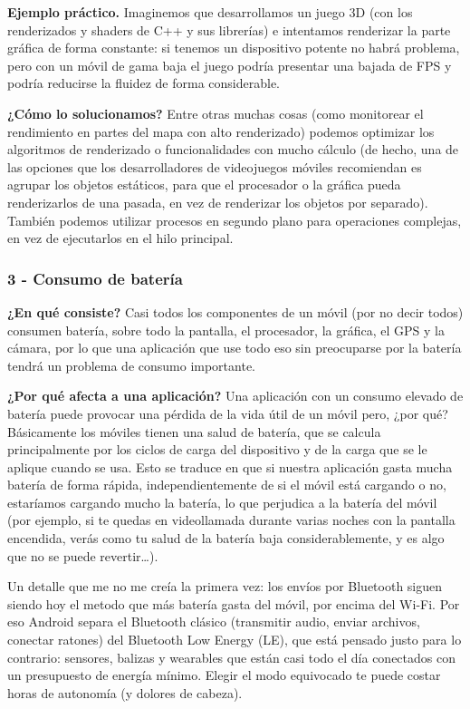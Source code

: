 \documentclass[11pt,a4paper]{article}
\newcommand{\campo}[1]{\textbf{\color{ink}#1}}
\begin{document}
	\campo{Ejemplo práctico.}
	Imaginemos que desarrollamos un juego 3D (con los renderizados y shaders de C++ y sus librerías) e intentamos renderizar la parte gráfica de forma constante: si tenemos un dispositivo potente no habrá problema, pero con un móvil de gama baja el juego podría presentar una bajada de FPS y podría reducirse la fluidez de forma considerable.
	
	\campo{¿Cómo lo solucionamos?}
	Entre otras muchas cosas (como monitorear el rendimiento en partes del mapa con alto renderizado) podemos optimizar los algoritmos de renderizado o funcionalidades con mucho cálculo (de hecho, una de las opciones que los desarrolladores de videojuegos móviles recomiendan es agrupar los objetos estáticos, para que el procesador o la gráfica pueda renderizarlos de una pasada, en vez de renderizar los objetos por separado). También podemos utilizar procesos en segundo plano para operaciones complejas, en vez de ejecutarlos en el hilo principal.
	
	\subsubsection*{3 - Consumo de batería}
	
	\campo{¿En qué consiste?}
	Casi todos los componentes de un móvil (por no decir todos) consumen batería, sobre todo la pantalla, el procesador, la gráfica, el GPS y la cámara, por lo que una aplicación que use todo eso sin preocuparse por la batería tendrá un problema de consumo importante.
	
	\campo{¿Por qué afecta a una aplicación?}
	Una aplicación con un consumo elevado de batería puede provocar una pérdida de la vida útil de un móvil pero, ¿por qué? Básicamente los móviles tienen una salud de batería, que se calcula principalmente por los ciclos de carga del dispositivo y de la carga que se le aplique cuando se usa. Esto se traduce en que si nuestra aplicación gasta mucha batería de forma rápida, independientemente de si el móvil está cargando o no, estaríamos cargando mucho la batería, lo que perjudica a la batería del móvil (por ejemplo, si te quedas en videollamada durante varias noches con la pantalla encendida, verás como tu salud de la batería baja considerablemente, y es algo que no se puede revertir\ldots).
	
	Un detalle que me no me creía la primera vez: los envíos por Bluetooth siguen siendo hoy el metodo que más batería gasta del móvil, por encima del Wi-Fi. Por eso Android separa el Bluetooth clásico (transmitir audio, enviar archivos, conectar ratones) del Bluetooth Low Energy (LE), que está pensado justo para lo contrario: sensores, balizas y wearables que están casi todo el día conectados con un presupuesto de energía mínimo. Elegir el modo equivocado te puede costar horas de autonomía (y dolores de cabeza).
	
\end{document}
